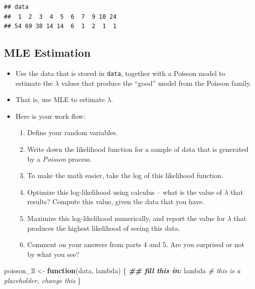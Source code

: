 \documentclass[
]{book}
\newenvironment{Shaded}{\begin{snugshade}}{\end{snugshade}}
\newcommand{\CommentTok}[1]{\textcolor[rgb]{0.56,0.35,0.01}{\textit{#1}}}
\newcommand{\ControlFlowTok}[1]{\textcolor[rgb]{0.13,0.29,0.53}{\textbf{#1}}}
\newcommand{\DocumentationTok}[1]{\textcolor[rgb]{0.56,0.35,0.01}{\textbf{\textit{#1}}}}
\newcommand{\NormalTok}[1]{#1}
\newcommand{\OtherTok}[1]{\textcolor[rgb]{0.56,0.35,0.01}{#1}}
\providecommand{\tightlist}{%
  \setlength{\itemsep}{0pt}\setlength{\parskip}{0pt}}
\theoremstyle{definition}
\theoremstyle{definition}
\theoremstyle{definition}
\theoremstyle{definition}
\theoremstyle{remark}
\begin{document}
\begin{verbatim}
## data
##  1  2  3  4  5  6  7  9 10 24 
## 54 69 38 14 14  6  1  2  1  1
\end{verbatim}

\hypertarget{mle-estimation}{%
\subsection{MLE Estimation}\label{mle-estimation}}

\begin{itemize}
\item
  Use the data that is stored in \texttt{data}, together with a Poisson model to estimate the \(\lambda\) values that produce the ``good'' model from the Poisson family.
\item
  That is, use MLE to estimate \(\lambda\).
\item
  Here is your work flow:

  \begin{enumerate}
  \def\labelenumi{\arabic{enumi}.}
  \tightlist
  \item
    Define your random variables.
  \item
    Write down the likelihood function for a sample of data that is generated by a \emph{Poisson} process.
  \item
    To make the math easier, take the log of this likelihood function.
  \item
    Optimize this log-likelihood using calculus -- what is the value of \(\lambda\) that results? Compute this value, given the data that you have.
  \item
    Maximize this log-likelihood numerically, and report the value for \(\lambda\) that produces the highest likelihood of seeing this data.
  \item
    Comment on your answers from parts 4 and 5. Are you surprised or not by what you see?
  \end{enumerate}
\end{itemize}

\begin{Shaded}
\begin{Highlighting}[]
\NormalTok{poisson\_ll }\OtherTok{\textless{}{-}} \ControlFlowTok{function}\NormalTok{(data, lambda) \{ }
  \DocumentationTok{\#\# fill this in:  }
\NormalTok{  lambda }\CommentTok{\# this is a placeholder, change this}
\NormalTok{\}}
\end{Highlighting}
\end{Shaded}
\end{document}
